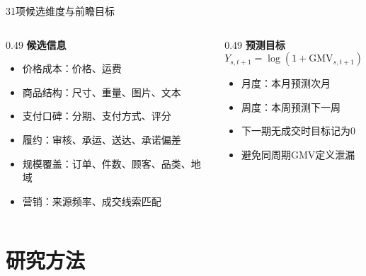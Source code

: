 \documentclass[aspectratio=169]{beamer}
\begin{document}
\begin{frame}{31项候选维度与前瞻目标}
  \begin{columns}[T]
    \begin{column}{0.49\textwidth}
      \textbf{候选信息}
      \begin{itemize}
        \item 价格成本：价格、运费
        \item 商品结构：尺寸、重量、图片、文本
        \item 支付口碑：分期、支付方式、评分
        \item 履约：审核、承运、送达、承诺偏差
        \item 规模覆盖：订单、件数、顾客、品类、地域
        \item 营销：来源频率、成交线索匹配
      \end{itemize}
    \end{column}
    \begin{column}{0.49\textwidth}
      \textbf{预测目标}
      \begin{equation*}
        Y_{s,t+1}=\log(1+\mathrm{GMV}_{s,t+1})
      \end{equation*}
      \begin{itemize}
        \item 月度：本月预测次月
        \item 周度：本周预测下一周
        \item 下一期无成交时目标记为0
        \item 避免同周期GMV定义泄漏
      \end{itemize}
    \end{column}
  \end{columns}
\end{frame}

\section{研究方法}
\end{document}

